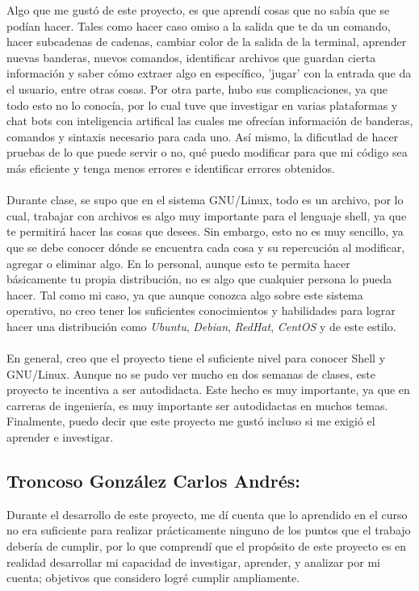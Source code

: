 \documentclass[letter,12pt]{article} %
\begin{document}
Algo que me gustó de este proyecto, es que aprendí cosas que no sabía que se podían hacer. Tales  como hacer caso omiso a la salida que te da un comando, hacer subcadenas de cadenas, cambiar color de la salida de la terminal, aprender nuevas banderas, nuevos comandos, identificar archivos que guardan cierta información y saber cómo extraer algo en específico, 'jugar' con la entrada que da el usuario, entre otras cosas. Por otra parte, hubo sus complicaciones, ya que todo esto no lo conocía, por lo cual tuve que investigar en varias plataformas y chat bots con inteligencia artifical las cuales me ofrecían información de banderas, comandos y sintaxis necesario para cada uno. Así mismo, la dificutlad de hacer pruebas de lo que puede servir o no, qué puedo modificar para que mi código sea más eficiente y tenga menos errores e identificar errores obtenidos. 
\\\\

Durante clase, se supo que en el sistema GNU/Linux, todo es un archivo, por lo cual, trabajar con archivos es algo muy importante para el lenguaje shell, ya que te permitirá hacer las cosas que desees. Sin embargo, esto no es muy sencillo, ya que se debe conocer dónde se encuentra cada cosa y su repercución al modificar, agregar o eliminar algo. En lo personal, aunque esto te permita hacer básicamente tu propia distribución, no es algo que cualquier persona lo pueda hacer. Tal como mi caso, ya que aunque conozca algo sobre este sistema operativo, no creo tener los suficientes conocimientos y habilidades para lograr hacer una distribución como \textit{Ubuntu}, \textit{Debian}, \textit{RedHat}, \textit{CentOS} y de este estilo.
\\\\
En general, creo que el proyecto tiene el suficiente nivel para conocer Shell y GNU/Linux. Aunque no se pudo ver mucho en dos semanas de clases, este proyecto te incentiva a ser autodidacta. Este hecho es muy importante, ya que en carreras de ingeniería, es muy importante ser autodidactas en muchos temas. Finalmente, puedo decir que este proyecto me gustó incluso si me exigió el aprender e investigar. 

\subsection*{Troncoso González Carlos Andrés:}
Durante el desarrollo de este proyecto, me dí cuenta que lo aprendido en el curso no era suficiente para realizar prácticamente ninguno de los puntos que el trabajo debería de cumplir, por lo que comprendí que el propósito de este proyecto es en realidad desarrollar mi capacidad de investigar, aprender, y analizar por mi cuenta; objetivos que considero logré cumplir ampliamente. 
\vspace{\baselineskip}
\end{document}
